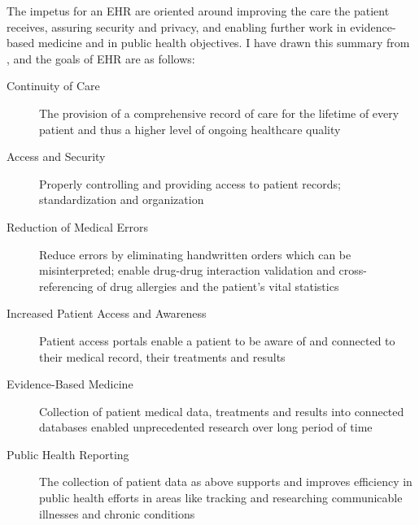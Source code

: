 \documentclass[10pt]{article}
\begin{document}
The impetus for an EHR are oriented around improving the care the patient receives, assuring security and privacy, and enabling further work in evidence-based medicine and in public health objectives.
I have drawn this summary from \cite{ehrbook}, and the goals of EHR are as follows:
\begin{description}
	\item[Continuity of Care] The provision of a comprehensive record of care for the lifetime of every patient and thus a higher level of ongoing healthcare quality
	\item[Access and Security] Properly controlling and providing access to patient records; standardization and organization
	\item[Reduction of Medical Errors] Reduce errors by eliminating handwritten orders which can be misinterpreted; enable drug-drug interaction validation and cross-referencing of drug allergies and the patient's vital statistics
	\item[Increased Patient Access and Awareness] Patient access portals enable a patient to be aware of and connected to their medical record, their treatments and results
	\item[Evidence-Based Medicine] Collection of patient medical data, treatments and results into connected databases enabled unprecedented research over long period of time
	\item[Public Health Reporting] The collection of patient data as above supports and improves efficiency in public health efforts in areas like tracking and researching communicable illnesses and chronic conditions
\end{description}



\end{document}
